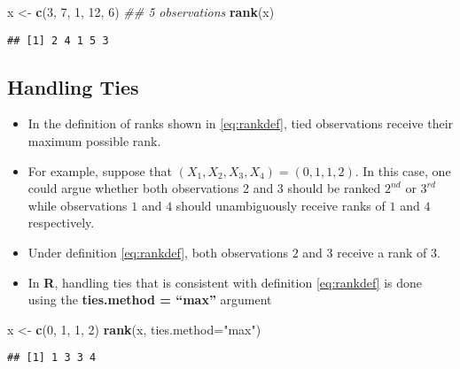 \documentclass[]{book}
\newenvironment{Shaded}{\begin{snugshade}}{\end{snugshade}}
\newcommand{\CommentTok}[1]{\textcolor[rgb]{0.56,0.35,0.01}{\textit{#1}}}
\newcommand{\DataTypeTok}[1]{\textcolor[rgb]{0.13,0.29,0.53}{#1}}
\newcommand{\DecValTok}[1]{\textcolor[rgb]{0.00,0.00,0.81}{#1}}
\newcommand{\KeywordTok}[1]{\textcolor[rgb]{0.13,0.29,0.53}{\textbf{#1}}}
\newcommand{\NormalTok}[1]{#1}
\newcommand{\StringTok}[1]{\textcolor[rgb]{0.31,0.60,0.02}{#1}}
\begin{document}
\begin{Shaded}
\begin{Highlighting}[]
\NormalTok{x <-}\StringTok{ }\KeywordTok{c}\NormalTok{(}\DecValTok{3}\NormalTok{, }\DecValTok{7}\NormalTok{, }\DecValTok{1}\NormalTok{, }\DecValTok{12}\NormalTok{, }\DecValTok{6}\NormalTok{)  }\CommentTok{## 5 observations}
\KeywordTok{rank}\NormalTok{(x)}
\end{Highlighting}
\end{Shaded}

\begin{verbatim}
## [1] 2 4 1 5 3
\end{verbatim}

\hypertarget{handling-ties}{%
\subsection{Handling Ties}\label{handling-ties}}

\begin{itemize}
\item
  In the definition of ranks shown in \eqref{eq:rankdef}, tied observations
  receive their maximum possible rank.
\item
  For example, suppose that \((X_{1}, X_{2}, X_{3}, X_{4}) = (0, 1, 1, 2)\).
  In this case, one could argue whether both observations 2 and 3 should be ranked
  \(2^{nd}\) or \(3^{rd}\) while observations \(1\) and \(4\) should unambiguously receive
  ranks of \(1\) and \(4\) respectively.
\item
  Under definition \eqref{eq:rankdef}, both observations \(2\) and \(3\) receive a rank of \(3\).
\item
  In \textbf{R}, handling ties that is consistent with definition \eqref{eq:rankdef} is done using the \textbf{ties.method = ``max''} argument
\end{itemize}

\begin{Shaded}
\begin{Highlighting}[]
\NormalTok{x <-}\StringTok{ }\KeywordTok{c}\NormalTok{(}\DecValTok{0}\NormalTok{, }\DecValTok{1}\NormalTok{, }\DecValTok{1}\NormalTok{, }\DecValTok{2}\NormalTok{)  }
\KeywordTok{rank}\NormalTok{(x, }\DataTypeTok{ties.method=}\StringTok{"max"}\NormalTok{)}
\end{Highlighting}
\end{Shaded}

\begin{verbatim}
## [1] 1 3 3 4
\end{verbatim}
\end{document}
